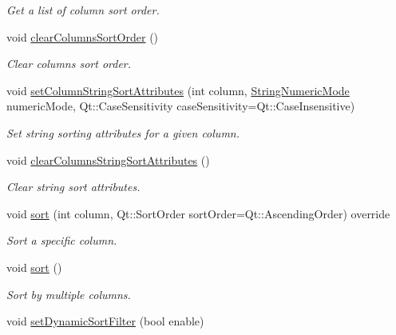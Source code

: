\begin{DoxyCompactItemize}
\begin{DoxyCompactList}\small\item\em Get a list of column sort order. \end{DoxyCompactList}\item 
void \hyperlink{class_mdt_1_1_item_model_1_1_sort_proxy_model_a34c1e790cbb91bb2437e3272ec160f26}{clear\+Columns\+Sort\+Order} ()
\begin{DoxyCompactList}\small\item\em Clear columns sort order. \end{DoxyCompactList}\item 
void \hyperlink{class_mdt_1_1_item_model_1_1_sort_proxy_model_aa950521a98fe18e3e426cbdc52fdd1dc}{set\+Column\+String\+Sort\+Attributes} (int column, \hyperlink{namespace_mdt_1_1_item_model_a88210a5defc335e5beaed03043620b25}{String\+Numeric\+Mode} numeric\+Mode, Qt\+::\+Case\+Sensitivity case\+Sensitivity=Qt\+::\+Case\+Insensitive)
\begin{DoxyCompactList}\small\item\em Set string sorting attributes for a given column. \end{DoxyCompactList}\item 
void \hyperlink{class_mdt_1_1_item_model_1_1_sort_proxy_model_a28e6beb7d35c73396a64b174ad7b9735}{clear\+Columns\+String\+Sort\+Attributes} ()
\begin{DoxyCompactList}\small\item\em Clear string sort attributes. \end{DoxyCompactList}\item 
void \hyperlink{class_mdt_1_1_item_model_1_1_sort_proxy_model_a8f8c6a6eb76fe984a21dfe71d696dad1}{sort} (int column, Qt\+::\+Sort\+Order sort\+Order=Qt\+::\+Ascending\+Order) override
\begin{DoxyCompactList}\small\item\em Sort a specific column. \end{DoxyCompactList}\item 
void \hyperlink{class_mdt_1_1_item_model_1_1_sort_proxy_model_a9d214a5366537d9d142f589a309f6422}{sort} ()
\begin{DoxyCompactList}\small\item\em Sort by multiple columns. \end{DoxyCompactList}\item 
void \hyperlink{class_mdt_1_1_item_model_1_1_sort_proxy_model_af876b581d18db1c44d05c56043563b71}{set\+Dynamic\+Sort\+Filter} (bool enable)\hypertarget{class_mdt_1_1_item_model_1_1_sort_proxy_model_af876b581d18db1c44d05c56043563b71}{}\label{class_mdt_1_1_item_model_1_1_sort_proxy_model_af876b581d18db1c44d05c56043563b71}


\end{DoxyCompactItemize}
